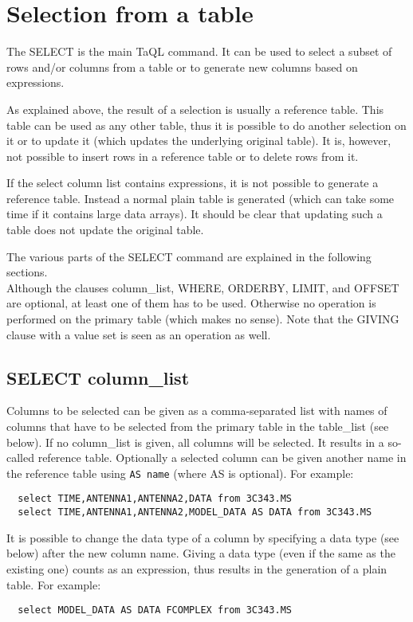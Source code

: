\section{Selection from a table}
The SELECT is the main TaQL command. It can be used to select a subset
of rows and/or columns from a table or to generate new columns based
on expressions.

As explained above, the result of a selection is usually a reference
table. This table can be used as any other table, thus it is possible
to do another selection on it or to update it (which updates the
underlying original table). It is, however, not possible to insert
rows in a reference table or to delete rows from it.

If the select column list contains expressions, it is not possible to
generate a reference table. Instead a normal plain table is generated
(which can take some time if it contains large data arrays).
It should be clear that updating such a table does not update the
original table.

The various parts of the SELECT command are explained in the following
sections.
\\Although the clauses column\_list, WHERE, ORDERBY, LIMIT, and OFFSET
are optional,
at least one of them has to be used. Otherwise no operation is
performed on the primary table (which makes no sense).
Note that the GIVING clause with a value set is seen as an operation
as well.

\subsection{\label{TAQL:COLUMNLIST}SELECT column\_list}
Columns to be selected can be given as
a comma-separated list with names of columns that have to be
selected from the primary table in the table\_list (see below).
If no column\_list is given, all columns will be selected.
It results in a so-called reference table. Optionally a
selected column can be given another name in the reference
table using \texttt{AS name} (where AS is optional).
For example:
\begin{verbatim}
  select TIME,ANTENNA1,ANTENNA2,DATA from 3C343.MS
  select TIME,ANTENNA1,ANTENNA2,MODEL_DATA AS DATA from 3C343.MS
\end{verbatim}
It is possible to change the data type of a column by specifying a
data type (see below) after the new column name. Giving a data type
(even if the same as the existing one) counts as an expression,
thus results in the generation of a plain table.
For example:
\begin{verbatim}
  select MODEL_DATA AS DATA FCOMPLEX from 3C343.MS
\end{verbatim}

